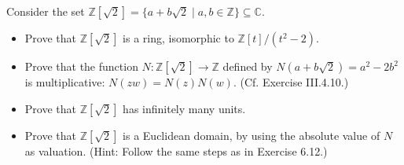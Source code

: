 \documentclass[../../master.tex]{subfiles}
\begin{document}
\begin{problem}
    Consider the set $\mathbb{Z}[\sqrt{2}] = \{a + b\sqrt{2} \mid a, b \in \mathbb{Z}\} \subseteq \mathbb{C}$.
    \begin{itemize}
        \item Prove that $\mathbb{Z}[\sqrt{2}]$ is a ring, isomorphic to $\mathbb{Z}[t] / (t^2 - 2)$.
        \item Prove that the function $N : \mathbb{Z}[\sqrt{2}] \to \mathbb{Z}$ defined by $N(a + b \sqrt{2}) = a^2 - 2b^2$ is multiplicative: $N(zw) = N(z) N(w)$. (Cf. Exercise III.4.10.)
        \item Prove that $\mathbb{Z}[\sqrt{2}]$ has infinitely many units.
        \item Prove that $\mathbb{Z}[\sqrt{2}]$ is a Euclidean domain, by using the absolute value of $N$ as valuation. 
            (Hint: Follow the same steps as in Exercise 6.12.)
    \end{itemize}
\end{problem}
\end{document}
